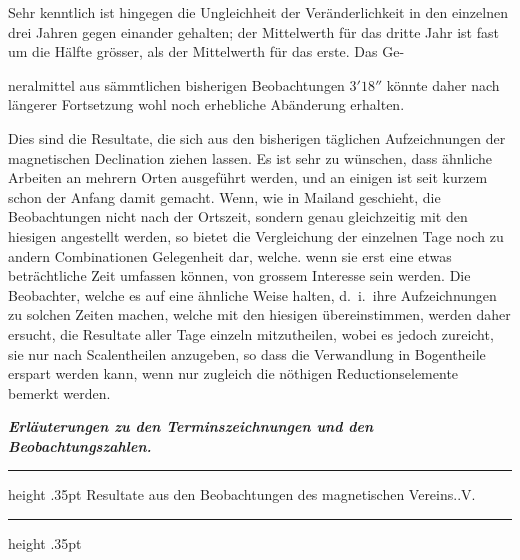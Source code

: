 Sehr kenntlich ist hingegen die Ungleichheit der Veränderlichkeit in den einzelnen drei Jahren gegen einander gehalten; der Mittelwerth für das dritte Jahr ist fast um die Hälfte grösser, als der Mittelwerth für das erste. Das Ge-\par
\clearpage
{}
\noindent neralmittel aus sämmtlichen bisherigen Beobachtungen $3'18''$ könnte daher nach längerer Fortsetzung wohl noch erhebliche Abänderung erhalten.

Dies sind die Resultate, die sich aus den bisherigen täglichen Aufzeichnungen der magnetischen Declination ziehen lassen. Es ist sehr zu wünschen, dass ähnliche Arbeiten an mehrern Orten ausgeführt werden, und an einigen ist seit kurzem schon der Anfang damit gemacht. Wenn, wie in Mailand geschieht, die Beobachtungen nicht nach der Ortszeit, sondern genau gleichzeitig mit den hiesigen angestellt werden, so bietet die Vergleichung der einzelnen Tage noch zu andern Combinationen Gelegenheit dar, welche. wenn sie erst eine etwas beträchtliche Zeit umfassen können, von grossem Interesse sein werden. Die Beobachter, welche es auf eine ähnliche Weise halten, d.\ i.\ ihre Aufzeichnungen zu solchen Zeiten machen, welche mit den hiesigen übereinstimmen, werden daher ersucht, die Resultate aller Tage einzeln mitzutheilen, wobei es jedoch zureicht, sie nur nach Scalentheilen anzugeben, so dass die Verwandlung in Bogentheile erspart werden kann, wenn nur zugleich die nöthigen Reductionselemente bemerkt werden.

\vspace{6mm}
\begin{center}\large\textbf{\textit{Erläuterungen zu den Terminszeichnungen und den Beobachtungszahlen.}}\par
[\textbf{\textit{Im Auszuge.}}]\end{center}
\begin{center}
\begin{minipage}{.96\linewidth}
\centering\fontsize{8.7}{10.5}\selectfont\bfseries
\hrule height .35pt\relax
\smallskip
Resultate aus den Beobachtungen des magnetischen Vereins..\quad V.\par
\smallskip
\hrule height .35pt\relax
\end{minipage}
\end{center}

